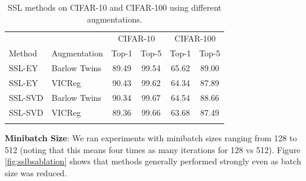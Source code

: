 \begin{table}[h!] 
\setlength{\tabcolsep}{6pt} %
\centering 
\begin{tabular}{llcccc} 
\toprule 
&& \multicolumn{2}{c}{CIFAR-10} & \multicolumn{2}{c}{CIFAR-100} \\ %
\cmidrule(lr){3-4} \cmidrule(lr){5-6} %
Method & Augmentation & Top-1 & Top-5 & Top-1 & Top-5 \\ 
\midrule
SSL-EY & Barlow Twins & 89.49 & 99.54 & 65.62& 89.00\\ 
SSL-EY & VICReg &90.43& 99.62 & 64.34&87.89\\ 
\midrule 
\addlinespace 
SSL-SVD & Barlow Twins & 90.34 & 99.67 & 64.54 & 88.66 \\ 
SSL-SVD & VICReg &89.36& 99.66 & 63.68&87.49 \\ 
\bottomrule 
\addlinespace 
\end{tabular} 
\caption{SSL methods on CIFAR-10 and CIFAR-100 using different augmentations.} 
\label{tab:selfsupsug} 
\end{table}


\textbf{Minibatch Size}: We ran experiments with minibatch sizes ranging from 128 to 512 (noting that this means four times as many iterations for 128 vs 512). Figure \ref{fig:sslbsablation} shows that methods generally performed strongly even as batch size was reduced.

